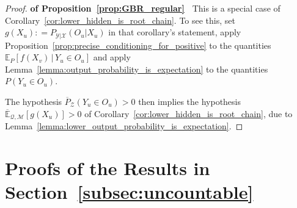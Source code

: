 \documentclass[twoside,11pt]{article}
\newcommand{\states}{\mathcal{X}}
\newcommand{\observs}{\mathcal{Y}}
\newcommand{\uexp}{\overline{\mathbb{E}}_{\rateset,\mathcal{M}}}
\newcommand{\rateset}{\mathcal{Q}}
\newcommand{\coloneqq}{:\!=}
\begin{document}
\begin{proof}{\bf of Proposition~\ref{prop:GBR_regular}~}
This is a special case of Corollary~\ref{cor:lower_hidden_is_root_chain}. To see this, set $g(X_u)\coloneqq P_{\observs\vert\states}(O_u\vert X_u)$ in that corollary's statement, apply Proposition~\ref{prop:precise_conditioning_for_positive} to the quantities $\mathbb{E}_P[f(X_v)\,\vert\,Y_u\in O_u]$ and apply Lemma~\ref{lemma:output_probability_is_expectation} to the quantities $P(Y_u\in O_u)$.

The hypothesis $\overline{P}_\mathcal{Z}(Y_u\in O_u)>0$ then implies the hypothesis $\uexp[g(X_u)]>0$ of Corollary~\ref{cor:lower_hidden_is_root_chain}, due to Lemma~\ref{lemma:lower_output_probability_is_expectation}.
\end{proof}

\section{Proofs of the Results in Section~\ref{subsec:uncountable}}
\end{document}
